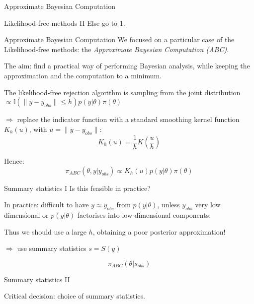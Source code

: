 \documentclass{beamer}
\begin{document}
\begin{section}{Approximate Bayesian Computation}
\begin{frame}{Likelihood-free methods II}
		\vspace{0.2cm}
		Else go to 1. 
	\end{frame}

	\begin{frame}{Approximate Bayesian Computation}
		We focused on a particular case of the Likelihood-free methods: the \emph{Approximate Bayesian Computation (ABC)}.
		
		\vspace{0.5cm}
		
		The aim: find a practical way of performing Bayesian analysis, while keeping the approximation and the computation to a minimum.
		
		\vspace{0.5cm}
		The likelihood-free rejection algorithm is sampling from the joint distribution $\propto \mathbb{I}(\parallel y-y_{obs} \parallel \leq h)p(y|\theta)\pi(\theta)$
		
	
		$\Longrightarrow$ replace the indicator function with a standard smoothing kernel function $K_h(u)$, with $u=\parallel y-y_{obs} \parallel$:
		\[ K_h(u)  =  \frac{1}{h}  K  ( \frac{u}{h} )  \]
		
		
		\vspace{0.2cm}
		Hence:
		\[\pi_{ABC}(\theta, y | y_{obs}) \propto K_h(u)p(y|\theta)\pi(\theta)\]

	\end{frame}

	\begin{frame}{Summary statistics I}
		Is this feasible in practice?
		
		\vspace{0.5cm}
		In practice: difficult to have $y\approx y_{obs}$ from $p(y|\theta)$, unless $y_{obs}$ very low dimensional or $p(y|\theta)$ factorises into low-dimensional components.
		
		Thus we should use a large $h$, obtaining a poor posterior approximation!
		
		$\Longrightarrow$ use summary statistics $s = S(y)$
		
		\[  \pi_{ABC} (\theta | s_{obs})   \]
	\end{frame}
		
	\begin{frame}{Summary statistics II}
		
		Critical decision: choice of summary statistics.\\
		
		\vspace{0.3cm}\\
		

\end{frame}
\end{section}
\end{document}
